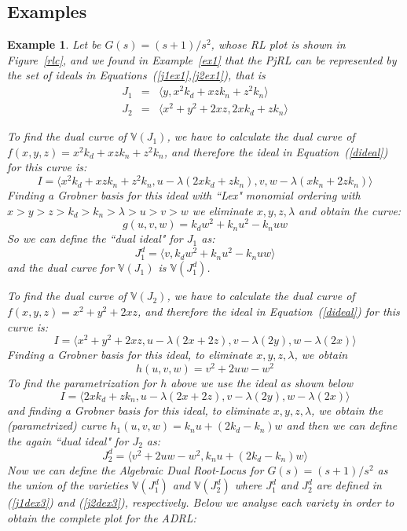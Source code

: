 \documentclass{article}
\newtheorem{example}{Example}[section]
\begin{document}
\subsection{Examples}

\begin{example}\label{ex3}\em
Let be $G(s) = (s+1)/s^2$, whose RL plot is shown in Figure~\ref{rlc}, and
we found in Example~\ref{ex1} that the PjRL can be represented by the set
of ideals in Equations~(\ref{j1ex1},\ref{j2ex1}), that is 
\begin{eqnarray}
J_1 & = & \langle y, x^2k_d + xzk_n + z^2k_n \label{j1ex3}\rangle \\
J_2 & = & \langle x^2 + y^2 + 2xz, 2xk_d +zk_n\label{j2ex3}\rangle 
\end{eqnarray}

To find the dual curve of $\mathbb V(J_1)$, we have to calculate the dual curve of 
$f(x,y,z)=x^2k_d + xzk_n + z^2k_n$, and therefore the ideal in Equation~(\ref{dideal})
for this curve is:
\[
I = \langle x^2k_d + xzk_n + z^2k_n, u-\lambda (2xk_d+zk_n), v, w-\lambda(xk_n+2zk_n)\rangle
\]
Finding a Grobner basis for this ideal with ``Lex" monomial ordering with 
$x>y>z>k_d>k_n>\lambda>u>v>w$ we eliminate $x,y, z, \lambda$ and obtain the curve:
\[
g(u,v,w) = k_dw^2+k_nu^2-k_nuw
\]
So we can define the ``dual ideal" for $J_1$ as:
\begin{equation}\label{j1dex3}
J_{1}^{d} = \langle v, k_dw^2+k_nu^2-k_nuw\rangle
\end{equation}
and the dual curve for $\mathbb V(J_1)$ is $\mathbb V(J_{1}^{d})$.

To find the dual curve of $\mathbb V(J_2)$, we have to calculate the dual curve of 
$f(x,y,z)=x^2 + y^2 +2xz$, and therefore the ideal in Equation~(\ref{dideal})
for this curve is:
\[
I = \langle x^2 + y^2 + 2xz, u-\lambda (2x + 2z), v - \lambda(2y), w-\lambda(2x)\rangle
\]
Finding a Grobner basis for this ideal, to eliminate $x,y,z,\lambda$, we obtain
\[
h(u,v,w) = v^2+2uw-w^2
\]
To find the parametrization for $h$ above we use the ideal
as shown below
\[
I = \langle 2xk_d +zk_n, u-\lambda (2x + 2z), v - \lambda(2y), w-\lambda(2x)\rangle
\]
and finding a Grobner basis for this ideal, to eliminate $x,y,z,\lambda$, we obtain
the (parametrized) curve $h_1(u,v,w) = k_nu + (2k_d - k_n)w$  and then we can define 
the again ``dual ideal" for $J_2$ as:
\begin{equation}\label{j2dex3}
J_{2}^{d} = \langle v^2+2uw-w^2, k_nu + (2k_d - k_n)w\rangle
\end{equation}
Now we can define the Algebraic Dual Root-Locus for $G(s)=(s+1)/s^2$ as the union 
of the varieties $\mathbb V(J_1^d)$ and $\mathbb V(J_2^d)$ where $J_1^d$ and $J_2^d$
are defined in (\ref{j1dex3}) and (\ref{j2dex3}), respectively. Below we analyse each variety 
in order to obtain the complete plot for the ADRL:


\end{example}
\end{document}
